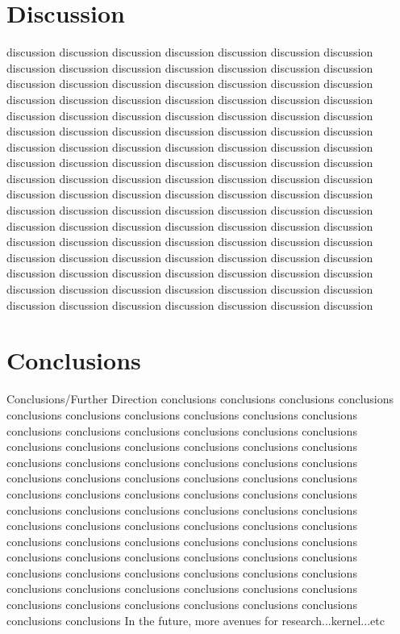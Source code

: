\documentclass[letterpaper, 11pt]{article}
\begin{document}
\section{Discussion}
\begin{multicols}{2}
discussion discussion discussion discussion discussion discussion discussion
discussion discussion discussion discussion discussion discussion discussion
discussion discussion discussion discussion discussion discussion discussion
discussion discussion discussion discussion discussion discussion discussion
discussion discussion discussion discussion discussion discussion discussion
discussion discussion discussion discussion discussion discussion discussion
discussion discussion discussion discussion discussion discussion discussion
discussion discussion discussion discussion discussion discussion discussion
discussion discussion discussion discussion discussion discussion discussion
discussion discussion discussion discussion discussion discussion discussion
discussion discussion discussion discussion discussion discussion discussion
discussion discussion discussion discussion discussion discussion discussion
discussion discussion discussion discussion discussion discussion discussion
discussion discussion discussion discussion discussion discussion discussion
discussion discussion discussion discussion discussion discussion discussion
discussion discussion discussion discussion discussion discussion discussion
discussion discussion discussion discussion discussion discussion discussion
\end{multicols}


\section{Conclusions}
\begin{multicols}{2}
Conclusions/Further Direction
conclusions conclusions conclusions conclusions conclusions conclusions conclusions 
conclusions conclusions conclusions conclusions conclusions conclusions conclusions 
conclusions conclusions conclusions conclusions conclusions conclusions conclusions 
conclusions conclusions conclusions conclusions conclusions conclusions conclusions 
conclusions conclusions conclusions conclusions conclusions conclusions conclusions 
conclusions conclusions conclusions conclusions conclusions conclusions conclusions 
conclusions conclusions conclusions conclusions conclusions conclusions conclusions 
conclusions conclusions conclusions conclusions conclusions conclusions conclusions 
conclusions conclusions conclusions conclusions conclusions conclusions conclusions 
conclusions conclusions conclusions conclusions conclusions conclusions conclusions 
conclusions conclusions conclusions conclusions conclusions conclusions conclusions 
conclusions conclusions conclusions conclusions conclusions conclusions conclusions 
In the future, more avenues for research...kernel...etc
\end{multicols}




\end{document}
